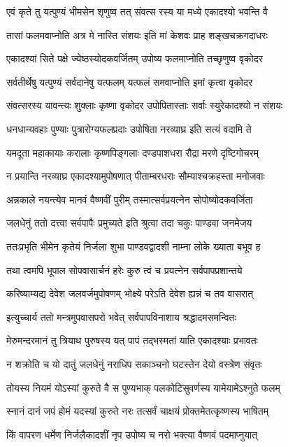 \twolineshloka
{एवं कृते तु यत्पुण्यं भीमसेन शृणुष्व तत्}
{संवत्स रस्य या मध्ये एकादश्यो भवन्ति वै} %

\twolineshloka
{तासां फलमवाप्नोति अत्र मे नास्ति संशयः}
{इति मां केशवः प्राह शङ्खचक्रगदाधरः} %

\twolineshloka
{एकादश्यां सिते पक्षे ज्येष्ठस्योदकवर्जितम्}
{उपोष्य फलमाप्नोति तच्छृणुष्व वृकोदर} %

\twolineshloka
{सर्वतीर्थेषु यत्पुण्यं सर्वदानेषु यत्फलम्}
{यत्फलं समवाप्नोति इमां कृत्वा वृकोदर} %

\twolineshloka
{संवत्सरस्य यावन्त्यः शुक्लाः कृष्णा वृकोदर}
{उपोपितास्ताः सर्वाः स्युरेकादश्यो न संशयः} %

\twolineshloka
{धनधान्यवहाः पुण्याः पुत्रारोग्यफलप्रदाः}
{उपोषिता नरव्याघ्र इति सत्यं वदामि ते} %

\twolineshloka
{यमदूता महाकायाः करालाः कृष्णपिङ्गलाः}
{दण्डपाशधरा रौद्रा मरणे दृष्टिगोचरम्} %

\twolineshloka
{न प्रयान्ति नरव्याघ्र एकादश्यामुपोषणात्}
{पीताम्बरधराः सौम्याश्चक्रहस्ता मनोजवाः} %

\twolineshloka
{अन्नकाले नयन्त्येव मानवं वैष्णवीं पुरीम्}
{तस्मात्सर्वप्रयत्नेन सोपोष्योदकवर्जिता} %

\twolineshloka
{जलधेनुं ततो दत्त्वा सर्वपापैः प्रमुच्यते}
{इति श्रुत्वा तदा चकुः पाण्डवा जनमेजय} %

\twolineshloka
{ततःप्रभृति भीमेन कृतेयं निर्जला शुभा}
{पाण्डवद्वादशी नाम्ना लोके ख्याता बभूव ह} %

\twolineshloka
{तथा त्वमपि भूपाल सोपवासार्चनं हरेः}
{कुरु त्वं च प्रयत्नेन सर्वपापप्रशान्तये} %

\twolineshloka
{करिष्याम्यद्य देवेश जलवर्जमुपोषणम्}
{भोक्ष्ये परेऽति देवेश ह्यन्नं च तव वासरात्} %

\twolineshloka
{इत्युच्चार्य ततो मन्त्रमुपवासपरो भवेत्}
{सर्वपापविनाशाय श्रद्धादमसमन्वितः} %

\twolineshloka
{मेरुमन्दरमानं तु त्रियाथ पुरुषस्य यत्}
{पापं तद्भस्मतां याति एकादश्याः प्रभावतः} %

\twolineshloka
{न शक्रोति च यो दातुं जलधेनुं नराधिप}
{सकाञ्चनो घटस्तेन देयो वस्त्रेण संवृतः} %

\twolineshloka
{तोयस्य नियमं योऽस्यां कुरुते वै स पुण्यभाक्}
{पलकोटिसुवर्णस्य यामेयामेऽश्नुते फलम्} %

\twolineshloka
{स्नानं दानं जपं होमं यदस्यां कुरुते नरः}
{तत्सर्वं चाक्षयं प्रोक्तमेतत्कृष्णस्य भाषितम्} %

\twolineshloka
{किं वापरण धर्मेण निर्जलैकादशीं नृप}
{उपोष्य च नरो भक्त्या वैष्णवं पदमाप्नुयात्} %

